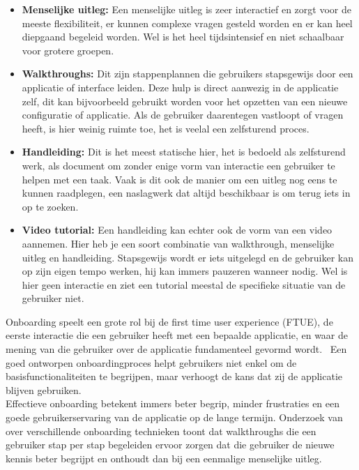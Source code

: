 \begin{itemize}
	\item \textbf{Menselijke uitleg:} Een menselijke uitleg is zeer interactief en zorgt voor de meeste flexibiliteit, er kunnen complexe vragen gesteld worden en er kan heel diepgaand begeleid worden. Wel is het heel tijdsintensief en niet schaalbaar voor grotere groepen.
	\item \textbf{Walkthroughs:} Dit zijn stappenplannen die gebruikers stapsgewijs door een applicatie of interface leiden. Deze hulp is direct aanwezig in de applicatie zelf, dit kan bijvoorbeeld gebruikt worden voor het opzetten van een nieuwe configuratie of applicatie. Als de gebruiker daarentegen vastloopt of vragen heeft, is hier weinig ruimte toe, het is veelal een zelfsturend proces.
	\item \textbf{Handleiding:} Dit is het meest statische hier, het is bedoeld als zelfsturend werk, als document om zonder enige vorm van interactie een gebruiker te helpen met een taak. Vaak is dit ook de manier om een uitleg nog eens te kunnen raadplegen, een naslagwerk dat altijd beschikbaar is om terug iets in op te zoeken.
	\item \textbf{Video tutorial:} Een handleiding kan echter ook de vorm van een video aannemen. Hier heb je een soort combinatie van walkthrough, menselijke uitleg en handleiding. Stapsgewijs wordt er iets uitgelegd en de gebruiker kan op zijn eigen tempo werken, hij kan immers pauzeren wanneer nodig. Wel is hier geen interactie en ziet een tutorial meestal de specifieke situatie van de gebruiker niet.
\end{itemize}

Onboarding speelt een grote rol bij de first time user experience (FTUE), de eerste interactie die een gebruiker heeft met een bepaalde applicatie, en waar de mening van die gebruiker over de applicatie fundamenteel gevormd wordt. 
\autocite{CascaesCardoso2017} Een goed ontworpen onboardingproces helpt gebruikers niet enkel om de basisfunctionaliteiten te begrijpen, maar verhoogt de kans dat zij de applicatie blijven gebruiken.
\\

Effectieve onboarding betekent immers beter begrip, minder frustraties en een goede gebruikerservaring van de applicatie op de lange termijn.
Onderzoek van \textcite{ChukwunonsoNweke2025} over verschillende onboarding technieken toont dat walkthroughs die een gebruiker stap per stap begeleiden ervoor zorgen dat die gebruiker de nieuwe kennis beter begrijpt en onthoudt dan bij een eenmalige menselijke uitleg.
\\

